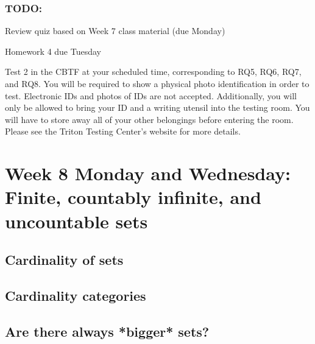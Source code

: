 \subsubsection*{TODO:}
\begin{list}
   {\itemsep2pt}
    \item Review quiz based on Week 7 class material (due Monday)
    \item Homework 4 due Tuesday
    \item Test 2 in the CBTF at your scheduled time, corresponding to RQ5, RQ6, RQ7, and RQ8.
You will be required to show a physical photo identification in order
to test. Electronic IDs and photos of IDs are not accepted. Additionally, you will only be allowed
to bring your ID and a writing utensil into the testing room. You will have to store away all of
your other belongings before entering the room. Please see the Triton Testing Center's website
for more details.
\end{list}

\newpage


\section*{Week 8 Monday and Wednesday: Finite, countably infinite, and uncountable sets}
\subsection*{Cardinality of sets}




\newpage



\newpage
\subsection*{Cardinality categories}



\subsection*{Are there always *bigger* sets?}

\newpage
